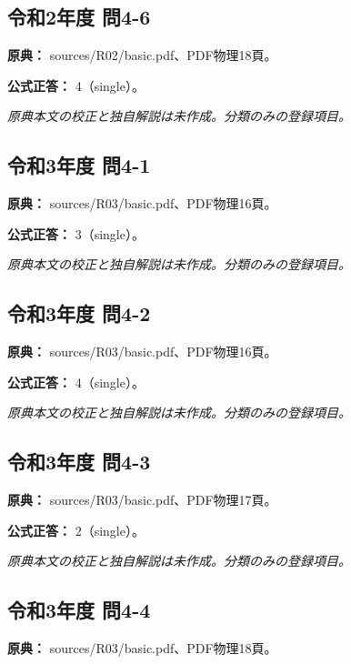 \subsection{令和2年度 問4-6}
\label{q:r02-reg-basic-4-6}

\noindent\textbf{原典：} sources/R02/basic.pdf、PDF物理18頁。

\textbf{公式正答：} 4（single）。

\par\textit{原典本文の校正と独自解説は未作成。分類のみの登録項目。}

\subsection{令和3年度 問4-1}
\label{q:r03-reg-basic-4-1}

\noindent\textbf{原典：} sources/R03/basic.pdf、PDF物理16頁。

\textbf{公式正答：} 3（single）。

\par\textit{原典本文の校正と独自解説は未作成。分類のみの登録項目。}

\subsection{令和3年度 問4-2}
\label{q:r03-reg-basic-4-2}

\noindent\textbf{原典：} sources/R03/basic.pdf、PDF物理16頁。

\textbf{公式正答：} 4（single）。

\par\textit{原典本文の校正と独自解説は未作成。分類のみの登録項目。}

\subsection{令和3年度 問4-3}
\label{q:r03-reg-basic-4-3}

\noindent\textbf{原典：} sources/R03/basic.pdf、PDF物理17頁。

\textbf{公式正答：} 2（single）。

\par\textit{原典本文の校正と独自解説は未作成。分類のみの登録項目。}

\subsection{令和3年度 問4-4}
\label{q:r03-reg-basic-4-4}

\noindent\textbf{原典：} sources/R03/basic.pdf、PDF物理18頁。

